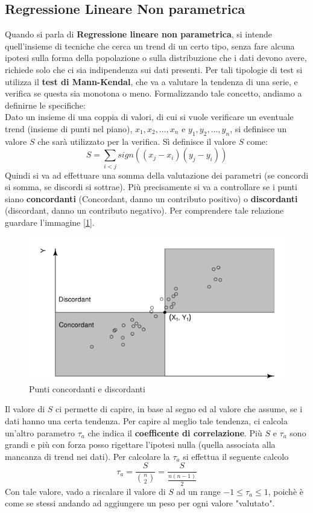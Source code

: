\subsection{Regressione Lineare Non parametrica}
Quando si parla di \textbf{Regressione lineare non parametrica}, si intende quell'insieme di tecniche che cerca un trend di un certo tipo, senza fare alcuna ipotesi sulla forma della popolazione o sulla distribuzione che i dati devono avere, richiede solo che ci sia indipendenza sui dati presenti. 
Per tali tipologie di test si utilizza il \textbf{test di Mann-Kendal}, che va a valutare la tendenza di una serie, e verifica se questa sia monotona o meno. Formalizzando tale concetto, andiamo a definirne le specifiche:
\\
Dato un insieme di una coppia di valori, di cui si vuole verificare un eventuale trend (insieme di punti nel piano), \(x_1, x_2, \dots, x_n\) e \(y_1, y_2, \dots, y_n\), si definisce un valore \(S\) che sarà utilizzato per la verifica. Sì definisce il valore \(S\) come:
\[
S = \sum_{i < j}sign((x_j - x_i)(y_j-y_i))
\]
Quindi si va ad effettuare una somma della valutazione dei parametri (se concordi si somma, se discordi si sottrae).
Più precisamente si va a controllare se i punti siano \textbf{concordanti} (Concordant, danno un contributo positivo) o \textbf{discordanti} (discordant, danno un contributo negativo). Per comprendere tale relazione guardare l'immagine [\ref{img:concordant-discordant}].

\begin{figure}[h]
\centering
\includegraphics[width=.7\textwidth]{img/chapter-5/concordant-discordant.png}
\caption{Punti concordanti e discordanti}\label{img:concordant-discordant}
\end{figure}

Il valore di \(S\) ci permette di capire, in base al segno ed al valore che assume, se i dati hanno una certa tendenza. Per capire al meglio tale tendenza, ci calcola un'altro parametro \(\tau_a\) che indica il \textbf{coefficente di correlazione}. Più \(S\) e \(\tau_a\) sono grandi e più con forza posso rigettare l'ipotesi nulla (quella associata alla mancanza di trend nei dati). 
Per calcolare la \(\tau_a\) si effettua il seguente calcolo
\[
\tau_a = \frac{S}{\binom{n}{2}} = \frac{S}{\frac{n(n-1)}{2}}
\]
Con tale valore, vado a riscalare il valore di \(S\) ad un range \(-1 \leq \tau_a \leq 1\), poichè è come se stessi andando ad aggiungere un peso per ogni valore "valutato".

